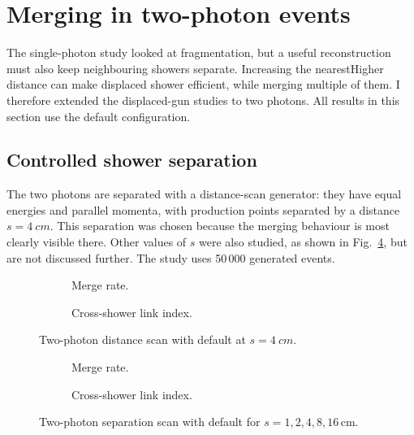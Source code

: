 \section{Merging in two-photon events}
\label{sec:merging}

The single-photon study looked at fragmentation, but a useful reconstruction
must also keep neighbouring showers separate. Increasing the nearestHigher distance
can make displaced shower efficient, while merging multiple of them.
I therefore extended the displaced-gun studies to two photons. All results in this section use the default \cluethreed{} configuration.

\subsection{Controlled shower separation}

The two photons are separated with a distance-scan generator: they have equal
energies and parallel momenta, with production points separated by a distance
$s=\SI{4}{cm}$.
This separation was chosen because the merging behaviour is most clearly visible
there. Other values of $s$ were also studied, as shown in
Fig.~\ref{fig:merge-distance-scan}, but are not discussed further.
The study uses 50\,000 generated events.

\begin{figure}[!tp]
  \centering
  \begin{subfigure}{0.49\linewidth}
    \caption{Merge rate.}
    \label{fig:mergeratedistance}
  \end{subfigure}\hfill
  \begin{subfigure}{0.49\linewidth}
    \caption{Cross-shower link index.}
    \label{fig:mergeindexdistance}
  \end{subfigure}
  \caption{Two-photon distance scan with default \cluethreed{} at $s=\SI{4}{cm}$.}
  \label{fig:mergingdistance}
\end{figure}

\begin{figure}[!tp]
  \centering
  \begin{subfigure}{0.49\linewidth}
    \caption{Merge rate.}
  \end{subfigure}\hfill
  \begin{subfigure}{0.49\linewidth}
    \caption{Cross-shower link index.}
  \end{subfigure}
  \caption{Two-photon separation scan with default \cluethreed{} for
  $s=1,2,4,8,16\,\mathrm{cm}$.}
  \label{fig:merge-distance-scan}
\end{figure}

